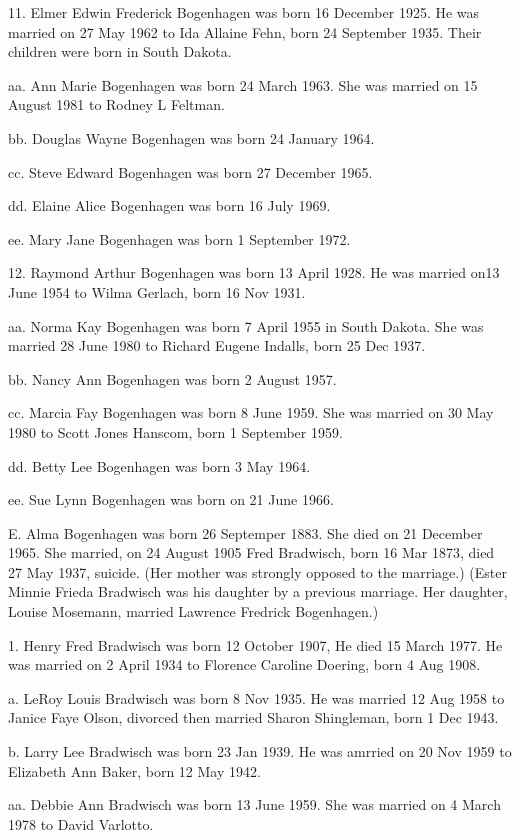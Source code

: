 \documentclass[a4paper]{article}
\begin{document}
11. Elmer Edwin Frederick Bogenhagen was born 16 December 1925.  He was married on 27 May 1962 to Ida Allaine Fehn, born 24 September 1935.  Their children were born in South Dakota.

aa. Ann Marie Bogenhagen was born 24 March 1963.  She was married on 15 August 1981 to Rodney L Feltman.

bb. Douglas Wayne Bogenhagen was born 24 January 1964.

cc. Steve Edward Bogenhagen was born 27 December 1965.

dd. Elaine Alice Bogenhagen was born 16 July 1969.

ee. Mary Jane Bogenhagen was born 1 September 1972. 	

12. Raymond Arthur Bogenhagen was born 13 April 1928.  He was married on13 June 1954 to Wilma Gerlach, born 16 Nov 1931.

aa. Norma Kay Bogenhagen was born 7 April 1955 in South Dakota.  She was married 28 June 1980 to Richard Eugene Indalls, born 25 Dec 1937.
 
bb. Nancy Ann Bogenhagen was born 2 August 1957.

cc. Marcia Fay Bogenhagen was born 8 June 1959.  She was married on 30 May 1980 to Scott Jones Hanscom, born 1 September 1959.
 
dd. Betty Lee Bogenhagen was born 3 May 1964.

ee. Sue Lynn Bogenhagen was born on 21 June 1966.

E. Alma Bogenhagen was born 26 Septemper 1883. She died on 21 December 1965. She married, on 24 August 1905 Fred Bradwisch, born 16 Mar 1873, died 27 May 1937, suicide.  (Her mother was strongly opposed to the marriage.)    (Ester Minnie Frieda Bradwisch was his daughter by a previous marriage.  Her daughter, Louise Mosemann, married Lawrence Fredrick Bogenhagen.)  

1. Henry  Fred Bradwisch was born 12 October 1907,  He died 15 March 1977. He was married on 2 April 1934 to Florence Caroline Doering, born 4 Aug 1908.
 
a. LeRoy Louis Bradwisch was born 8 Nov 1935.  He was married 12 Aug 1958 to Janice Faye Olson, divorced then married Sharon Shingleman, born 1 Dec 1943.

b. Larry Lee Bradwisch was born 23 Jan 1939.  He was amrried on 20 Nov 1959 to Elizabeth Ann Baker, born 12 May 1942.
 
aa. Debbie Ann Bradwisch was born 13 June 1959.  She was married on 4 March 1978 to David Varlotto.
 
\end{document}
